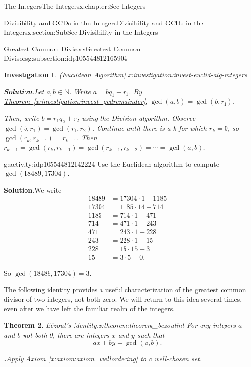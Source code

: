 \documentclass[oneside,10pt,]{book}
\newcommand{\blocktitlefont}{\relax}
\newcommand{\xreffont}{\relax}
\numberwithin{equation}{section}
\def\N{{\mathbb N}}
\newtheorem{theorem}{Theorem}[section]
\newtheorem{investigation}[theorem]{Investigation}
\newcommand{\amp}{&}
\begin{document}
\begin{chapterptx}{The Integers}{}{The Integers}{}{}{x:chapter:Sec-Integers}
\begin{sectionptx}{Divisibility and GCDs in the Integers}{}{Divisibility and GCDs in the Integers}{}{}{x:section:SubSec-Divisibility-in-the-Integers}
\begin{subsectionptx}{Greatest Common Divisors}{}{Greatest Common Divisors}{}{}{g:subsection:idp105544812165904}
\begin{investigation}{(Euclidean Algorithm).}{x:investigation:invest-euclid-alg-integers}
\par\smallskip%
\noindent\textbf{\blocktitlefont Solution}.\hypertarget{g:solution:idp105544812137616}{}\quad{}Let \(a,b\in \N\). Write \(a = bq_1+r_1\). By \hyperref[x:investigation:invest_gcdremainder]{Theorem~{\xreffont\ref{x:investigation:invest_gcdremainder}}}, \(\gcd(a,b) = \gcd(b,r_1)\).%
\par
Then, write \(b = r_1 q_2 + r_2\) using the Division algorithm. Observe \(\gcd(b,r_1) = \gcd(r_1,r_2)\). Continue until there is a \(k\) for which \(r_k = 0\), so \(\gcd(r_k,r_{k-1}) = r_{k-1}\). Then \(r_{k-1}= \gcd(r_k, r_{k-1}) = \gcd(r_{k-1},r_{k-2}) = \cdots = \gcd(a,b)\).%
\end{investigation}%
\begin{activity}{}{g:activity:idp105544812142224}%
Use the Euclidean algorithm to compute \(\gcd(18489,17304)\).%
\par\smallskip%
\noindent\textbf{\blocktitlefont Solution}.\hypertarget{g:solution:idp105544812143376}{}\quad{}We write%
\begin{align*}
18489 \amp = 17304 \cdot 1 +1185\\
17304 \amp = 1185\cdot 14 +714\\
1185 \amp = 714 \cdot 1 + 471\\
714 \amp = 471 \cdot 1+ 243\\
471 \amp = 243\cdot 1 + 228\\
243 \amp = 228 \cdot 1+ 15\\
228 \amp = 15 \cdot 15 + 3\\
15 \amp = 3\cdot 5 + 0\text{.}
\end{align*}
%
\par
So \(\gcd(18489,17304)=3\).%
\end{activity}%
The following identity provides a useful characterization of the greatest common divisor of two integers, not both zero. We will return to this idea several times, even after we have left the familiar realm of the integers.%
\begin{theorem}{Bézout's Identity.}{}{x:theorem:theorem_bezoutint}%
%
For any integers \(a\) and \(b\) not both 0, there are integers \(x\) and \(y\) such that%
\begin{equation*}
ax + by = \gcd(a,b)\text{.}
\end{equation*}
%
\par\smallskip%
\noindent\textbf{\blocktitlefont 1.}\quad{}Apply \hyperref[x:axiom:axiom_wellordering]{Axiom~{\xreffont\ref{x:axiom:axiom_wellordering}}} to a well-chosen set.%

\end{theorem}
\end{subsectionptx}
\end{sectionptx}
\end{chapterptx}
\end{document}
